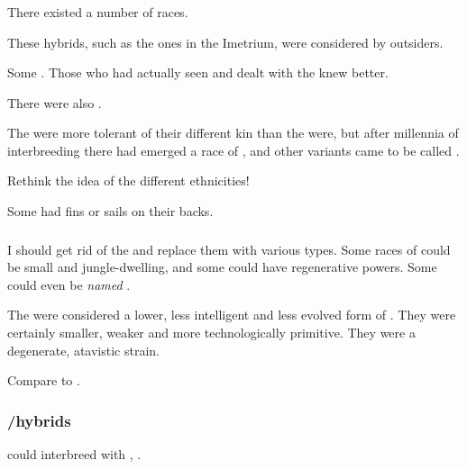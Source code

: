 \subsubsection{\Demiscathae}
There existed a number of \quo{\demiscatha} races. 

\begin{gloss}
    These hybrids, such as the ones in the Imetrium, were considered \demiscathae by outsiders. 
  
    Some .
    Those who had actually seen and dealt with the \nagae knew better.
\end{gloss}

There were also .

The \scathae were more tolerant of their different kin than the \humans were, but after millennia of interbreeding there had emerged a race of  \scathae, and other variants came to be called \quo{\demiscathae}. 

Rethink the idea of the different \scatha ethnicities!

Some \scathae had fins or sails on their backs. 





\subsubsection{\Meccara}
I should get rid of the \meccara and replace them with various \demiscatha types. 
Some races of \demiscathae could be small and jungle-dwelling, and some could have regenerative powers. 
Some could even be \emph{named} \quo{\meccara}. 

The \meccara were considered a lower, less intelligent and less evolved form of \scathae. 
They were certainly smaller, weaker and more technologically primitive.
They were a degenerate, atavistic strain.

Compare to \cite{RobertEHoward:WormsoftheEarth}. 





\subsubsection{\Scatha/\naga hybrids}
\Scathae could interbreed with \nagae, . 










